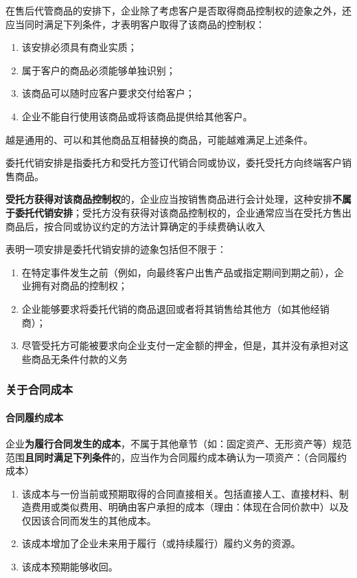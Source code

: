 \documentclass[UTF8,12pt]{ctexart}
\numberwithin{equation}{section} %
\numberwithin{figure}{section}
\numberwithin{table}{section}
\begin{document}
	在售后代管商品的安排下，企业除了考虑客户是否取得商品控制权的迹象之外，还应当同时满足下列条件，才表明客户取得了该商品的控制权：
	\begin{enumerate}
		\item 该安排必须具有商业实质；
		
		\item 属于客户的商品必须能够单独识别；
		
		\item 该商品可以随时应客户要求交付给客户；
		
		\item 企业不能自行使用该商品或将该商品提供给其他客户。
	\end{enumerate}
	越是通用的、可以和其他商品互相替换的商品，可能越难满足上述条件。
	
	委托代销安排是指委托方和受托方签订代销合同或协议，委托受托方向终端客户销售商品。
	
	\textbf{受托方获得对该商品控制权}的，企业应当按销售商品进行会计处理，这种安排\textbf{不属于委托代销安排}；受托方没有获得对该商品控制权的，企业通常应当在受托方售出商品后，按合同或协议约定的方法计算确定的手续费确认收入
	
	表明一项安排是委托代销安排的迹象包括但不限于：
	\begin{enumerate}
		\item 在特定事件发生之前（例如，向最终客户出售产品或指定期间到期之前），企业拥有对商品的控制权；
		
		\item 企业能够要求将委托代销的商品退回或者将其销售给其他方（如其他经销商）；
		
		\item 尽管受托方可能被要求向企业支付一定金额的押金，但是，其并没有承担对这些商品无条件付款的义务
	\end{enumerate}

	
	
	
	\subsubsection{关于合同成本}
	\paragraph{合同履约成本}
	企业\textbf{为履行合同发生的成本}，不属于其他章节（如：固定资产、无形资产等）规范范围\textbf{且同时满足下列条件}的，应当作为合同履约成本确认为一项资产：（合同履约成本）
	\begin{enumerate}
		\item 该成本与一份当前或预期取得的合同直接相关。包括直接人工、直接材料、制造费用或类似费用、明确由客户承担的成本（理由：体现在合同价款中）以及仅因该合同而发生的其他成本。
		
		\item 该成本增加了企业未来用于履行（或持续履行）履约义务的资源。
		
		\item 该成本预期能够收回。
	\end{enumerate}
\end{document}
